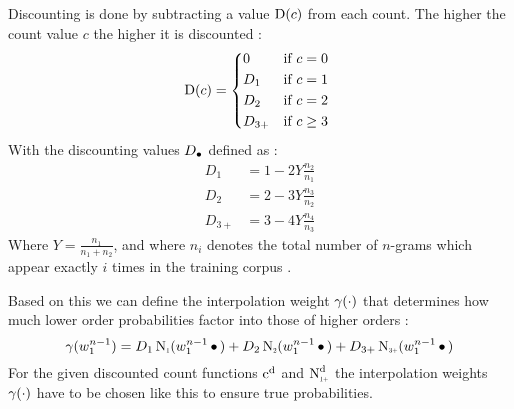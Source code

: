 Discounting is done by subtracting a value $\operatorname{D}(c)$ from each count.
The higher the count value $c$ the higher it is discounted
\parencite{ChenGoodman1999}:
\begin{equation}
  \Discount(c) =
    \begin{dcases*}
      0      & if $c = 0$ \\
      D_1    & if $c = 1$ \\
      D_2    & if $c = 2$ \\
      D_{3+} & if $c \geq 3$
    \end{dcases*}
\end{equation}
With the discounting values $D_\bullet$ defined as
\parencite{ChenGoodman1999}:
\begin{subequations}
  \label{eq:discounts}
  \begin{align}
    D_1    &= 1 - 2 Y \frac{n_2}{n_1} \\
    D_2    &= 2 - 3 Y \frac{n_3}{n_2} \\
    D_{3+} &= 3 - 4 Y \frac{n_4}{n_3}
  \end{align}
\end{subequations}
Where $Y = \frac{n_1}{n_1 + n_2}$, and where $n_i$
denotes the total number of \mbox{$n$-grams} which appear exactly $i$ times
in the training corpus \parencite{ChenGoodman1999}.

Based on this we can define the interpolation weight $\gamma(\cdot)$ that
determines how much lower order probabilities factor into those of higher
orders \parencite{ChenGoodman1999}:
\begin{equation}
  \label{eq:review-gamma}
  \gamma(w_1^{n-1}) =   D_1    \ContCountI    (w_1^{n-1} \WSkp)
                      + D_2    \ContCountII   (w_1^{n-1} \WSkp)
                      + D_{3+} \ContCountIIIp (w_1^{n-1} \WSkp)
\end{equation}
For the given discounted count functions $\DiscountedCount$ and
$\DiscountedCount*$ the interpolation weights $\gamma(\cdot)$ have to be
chosen like this to ensure true probabilities.
